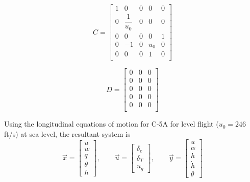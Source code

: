 \documentclass[11pt]{article}
\begin{document}
\begin{equation*}
C =
\begin{bmatrix}
    1 &          0     & 0 & 0   & 0\\
    0 & \dfrac{1}{u_0} & 0 & 0   & 0\\
    0 &          0     & 0 & 0   & 1\\
    0 &         -1     & 0 & u_0 & 0\\
    0 &          0     & 0 & 1   & 0\\
\end{bmatrix}
\end{equation*}

\begin{equation*}
D =
\begin{bmatrix}
    0 & 0 & 0 \\
    0 & 0 & 0 \\
    0 & 0 & 0 \\
    0 & 0 & 0 \\
    0 & 0 & 0 \\
\end{bmatrix}
\end{equation*}

\clearpage
\noindent Using the longitudinal equations of motion for C-5A for level flight ($u_0=246$ ft/s) at sea level, the resultant system is
$$
\vec{x}= \left[ \begin{array}{c}        u \\ w        \\ q   \\ \theta \\       h \end{array} \right], \qquad
\vec{u}= \left[ \begin{array}{c} \delta_e \\ \delta_T \\ u_g                      \end{array} \right], \qquad
\vec{y}= \left[ \begin{array}{c}        u \\ \alpha   \\ h   \\ \dot{h} \\ \theta \end{array} \right] 
$$
\end{document}
